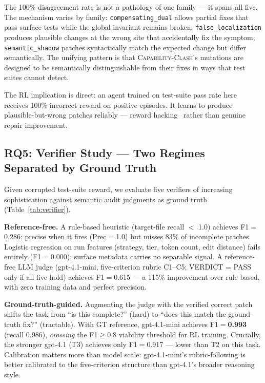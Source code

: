 \documentclass[sigconf,review,anonymous]{acmart}
\newcommand{\ccbench}{\textsc{Capability-Clash}}
\begin{document}
The 100\% disagreement rate is not a pathology of one family — it spans all five. The mechanism varies by family: \texttt{compensating\_dual} allows partial fixes that pass surface tests while the global invariant remains broken; \texttt{false\_localization} produces plausible changes at the wrong site that accidentally fix the symptom; \texttt{semantic\_shadow} patches syntactically match the expected change but differ semantically. The unifying pattern is that \ccbench{}'s mutations are designed to be semantically distinguishable from their fixes in ways that test suites cannot detect.

The RL implication is direct: an agent trained on test-suite pass rate here receives 100\% incorrect reward on positive episodes. It learns to produce plausible-but-wrong patches reliably — reward hacking~\cite{amodei2016concrete} rather than genuine repair improvement.

\subsection{RQ5: Verifier Study — Two Regimes Separated by Ground Truth}
\label{sec:rq5}

Given corrupted test-suite reward, we evaluate five verifiers of increasing sophistication against semantic audit judgments as ground truth (Table~\ref{tab:verifier}).

\textbf{Reference-free.} A rule-based heuristic (target-file recall $<$ 1.0) achieves F1$=$0.286: precise when it fires (Prec$=$1.0) but misses 83\% of incomplete patches. Logistic regression on run features (strategy, tier, token count, edit distance) fails entirely (F1$=$0.000): surface metadata carries no separable signal. A reference-free LLM judge (gpt-4.1-mini, five-criterion rubric C1--C5; VERDICT = PASS only if all five hold) achieves F1$=$0.615 — a 115\% improvement over rule-based, with zero training data and perfect precision.

\textbf{Ground-truth-guided.} Augmenting the judge with the verified correct patch shifts the task from ``is this complete?'' (hard) to ``does this match the ground-truth fix?'' (tractable). With GT reference, gpt-4.1-mini achieves F1$=$\textbf{0.993} (recall 0.986), \emph{crossing} the F1$\geq$0.8 viability threshold for RL training. Crucially, the stronger gpt-4.1 (T3) achieves only F1$=$0.917 — lower than T2 on this task. Calibration matters more than model scale: gpt-4.1-mini's rubric-following is better calibrated to the five-criterion structure than gpt-4.1's broader reasoning style.
\end{document}
